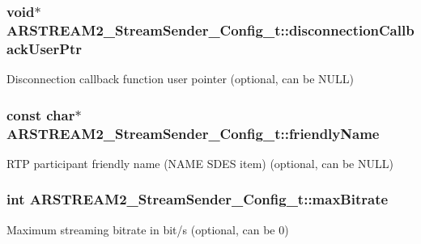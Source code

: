 \subsubsection[{\texorpdfstring{disconnection\+Callback\+User\+Ptr}{disconnectionCallbackUserPtr}}]{\setlength{\rightskip}{0pt plus 5cm}void$\ast$ A\+R\+S\+T\+R\+E\+A\+M2\+\_\+\+Stream\+Sender\+\_\+\+Config\+\_\+t\+::disconnection\+Callback\+User\+Ptr}\hypertarget{struct_a_r_s_t_r_e_a_m2___stream_sender___config__t_a33ceabdb80f765ac9b8e69da83032644}{}\label{struct_a_r_s_t_r_e_a_m2___stream_sender___config__t_a33ceabdb80f765ac9b8e69da83032644}
Disconnection callback function user pointer (optional, can be N\+U\+LL) 
\subsubsection[{\texorpdfstring{friendly\+Name}{friendlyName}}]{\setlength{\rightskip}{0pt plus 5cm}const char$\ast$ A\+R\+S\+T\+R\+E\+A\+M2\+\_\+\+Stream\+Sender\+\_\+\+Config\+\_\+t\+::friendly\+Name}\hypertarget{struct_a_r_s_t_r_e_a_m2___stream_sender___config__t_af54158ca53377bfeee0cf26bdecea2a6}{}\label{struct_a_r_s_t_r_e_a_m2___stream_sender___config__t_af54158ca53377bfeee0cf26bdecea2a6}
R\+TP participant friendly name (N\+A\+ME S\+D\+ES item) (optional, can be N\+U\+LL) 
\subsubsection[{\texorpdfstring{max\+Bitrate}{maxBitrate}}]{\setlength{\rightskip}{0pt plus 5cm}int A\+R\+S\+T\+R\+E\+A\+M2\+\_\+\+Stream\+Sender\+\_\+\+Config\+\_\+t\+::max\+Bitrate}\hypertarget{struct_a_r_s_t_r_e_a_m2___stream_sender___config__t_aaf186fd66dde20582c813d65aa83288e}{}\label{struct_a_r_s_t_r_e_a_m2___stream_sender___config__t_aaf186fd66dde20582c813d65aa83288e}
Maximum streaming bitrate in bit/s (optional, can be 0) 
